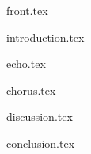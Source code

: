 
\frontmatter

{front.tex}

{introduction.tex}

\tableofcontents*

\mainmatter

{echo.tex}

{chorus.tex}

{discussion.tex}

{conclusion.tex}

\backmatter

\printbibliography
